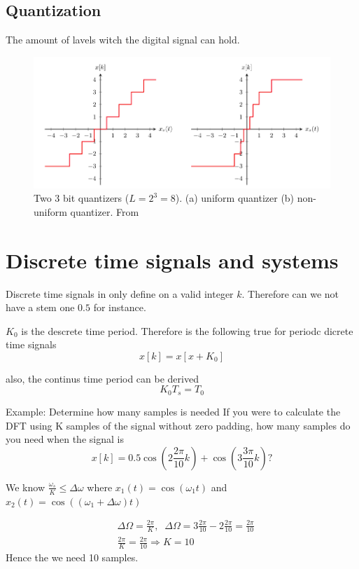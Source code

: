 \subsection{Quantization}
The amount of lavels witch the digital signal can hold.

\begin{figure}[H]
    \centering
    \includegraphics[width=12cm]{image/quantization.png}
    \caption{Two 3 bit quantizers ($L=2^3=8$). (a) uniform quantizer (b) non-uniform quantizer. From \cite{}}
    \label{fig:quantization}
\end{figure}


\section{Discrete time signals and systems}
Discrete time signals in only define on a valid integer $k$. Therefore can we not have 
a stem one $0.5$ for instance.

$K_0$ is the descrete time period. Therefore is the following true for periodc dicrete time signals
\begin{equation*}
   x[k] = x[x+K_0]
\end{equation*}

also, the continus time period can be derived
\begin{equation*}
    K_0T_s = T_0
\end{equation*}

\begin{exampleblock}{Example: Determine how many samples is needed}
    If you were to calculate the DFT using K samples of the signal without zero padding,
    how many samples do you need when the signal is 
    \begin{equation*}
        x[k] = 0.5\cos\left(2\frac{2\pi}{10}k\right) + \cos\left(3\frac{3\pi}{10}k\right) \text{?}
    \end{equation*}

    We know $\frac{\omega_s}{K}\leq \Delta\omega$ where $x_1(t)=\cos\left(\omega_1 t\right)$ and $x_2(t)=\cos((\omega_1 +\Delta\omega)t)$

    \begin{align*}    
        &\Delta\Omega = \frac{2\pi}{K}, \;\; \Delta\Omega = 3\frac{2\pi}{10} - 2\frac{2\pi}{10} = \frac{2\pi}{10}  \\
        &\frac{2\pi}{K} = \frac{2\pi}{10} \Rightarrow K = 10
    \end{align*}
    Hence the we need 10 samples.
\end{exampleblock}


